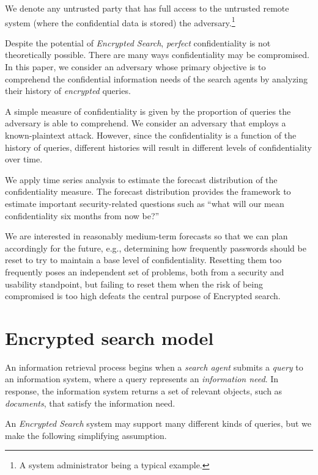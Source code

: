 \documentclass[final,
  11pt,
]{article}
\begin{document}
We denote any untrusted party that has full access to the untrusted
remote system (where the confidential data is stored) the
adversary.\footnote{A system
administrator being a typical example.}

Despite the potential of \emph{Encrypted Search}, \emph{perfect}
confidentiality is not theoretically possible. There are many ways
confidentiality may be compromised. In this paper, we consider an
adversary whose primary objective is to comprehend the confidential
information needs of the search agents by analyzing their history of
\emph{encrypted} queries.

A simple measure of confidentiality is given by the proportion of
queries the adversary is able to comprehend. We consider an adversary
that employs a known-plaintext attack. However, since the
confidentiality is a function of the history of queries, different
histories will result in different levels of confidentiality over time.

We apply time series analysis to estimate the forecast distribution of
the confidentiality measure. The forecast distribution provides the
framework to estimate important security-related questions such as
``what will our mean confidentiality six months from now be?''

We are interested in reasonably medium-term forecasts so that we can
plan accordingly for the future, e.g., determining how frequently
passwords should be reset to try to maintain a base level of
confidentiality. Resetting them too frequently poses an independent set
of problems, both from a security and usability standpoint, but failing
to reset them when the risk of being compromised is too high defeats the
central purpose of Encrypted search.

\hypertarget{encrypted-search-model}{%
\section{Encrypted search model}\label{encrypted-search-model}}

\label{sec:es_model} An information retrieval process begins when a
\emph{search agent} submits a \emph{query} to an information system,
where a query represents an \emph{information need}. In response, the
information system returns a set of relevant objects, such as
\emph{documents}, that satisfy the information need.

An \emph{Encrypted Search} system may support many different kinds of
queries, but we make the following simplifying assumption.
\end{document}
